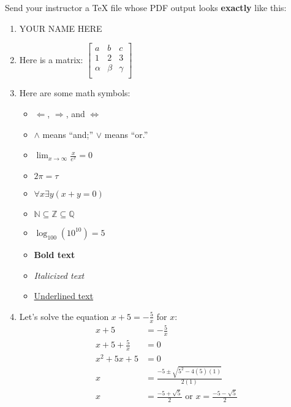 \documentclass[10pt,letterpaper]{article}
\author{Zian Kang}
\begin{document}
Send your instructor a TeX file whose PDF output looks \textbf{exactly} like this:

\begin{enumerate}
    \item YOUR NAME HERE

    \item Here is a matrix:
    $
    \begin{bmatrix}
        a & b & c \\
        1 & 2 & 3 \\
        \alpha & \beta & \gamma\\
    \end{bmatrix}
    $

    \item Here are some math symbols:
    \begin{multicols}{2}
        \begin{itemize}
            \item $\Longleftarrow$, $\Longrightarrow$, and $\Longleftrightarrow$
            \item $\land$ means ``and;'' $\lor$ means ``or.''
            \item $\displaystyle\lim_{x\to\infty}\frac{x}{e^x}=0$
            \item $2\pi=\tau$
            \item $\forall x\exists y(x+y=0)$
            \item $\mathbb{N}\subseteq\mathbb{Z}\subseteq\mathbb{Q}$
            \item $\log_{100}(10^{10})=5$
            \item \textbf{Bold text}
            \item \textit{Italicized text}
            \item \underline{Underlined text}
        \end{itemize}
    \end{multicols}

    \item Let’s solve the equation $\displaystyle x + 5 = -\frac{5}{x}$ for $x$:
    \begin{align*}
        x+5&=-\frac{5}{x} \\
        x+5+\frac{5}{x}&= 0 \\
        x^2+5x+5&= 0 \\
        x&=\frac{-5\pm\sqrt{5^2-4(5)(1)}}{2(1)} \\
        x&=\frac{-5+\sqrt{5}}{2}\text{ or }x=\frac{-5-\sqrt{5}}{2}
    \end{align*}


\end{enumerate}
\end{document}
